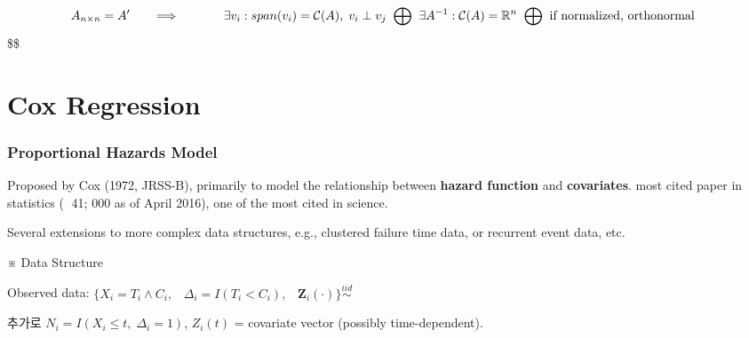 \documentclass[
]{book}
\begin{document}
{{{\begin{alignat}{3}
&A_{n \times n} = A'
&&\; \; \; \Longrightarrow \; \; \; 
&& 
&&
&&


\exists v_i : span(v_i) = \mathcal C (A), \; v_i \perp v_j 
\; \; \tiny {\bigoplus} \; \; \normalsize \exists A^{-1} : \mathcal C(A) = \mathbb{R}^n
\; \; \tiny {\bigoplus} \; \; \normalsize \text{if normalized, orthonormal}

\end{alignat}
\$\$

\hypertarget{section-10}{%
\section{}\label{section-10}}

\hypertarget{section-11}{%
\section{}\label{section-11}}

\hypertarget{section-12}{%
\section{}\label{section-12}}

\hypertarget{cox-regression}{%
\section{Cox Regression}\label{cox-regression}}

\hypertarget{proportional-hazards-model}{%
\subsubsection{Proportional Hazards Model}\label{proportional-hazards-model}}

Proposed by Cox (1972, JRSS-B), primarily to model the relationship between \textbf{hazard function} and \textbf{covariates}. most cited paper in statistics ( 41; 000 as of April 2016), one of the most cited in science.

Several extensions to more complex data structures, e.g., clustered failure time data, or recurrent event data, etc.

※ Data Structure

Observed data: \(\Big \{ X_i = T_i \wedge C_i, \; \; \; \Delta_i = I(T_i < C_i), \; \;\; \mathbf Z_i (\cdot) \Big \} \overset {iid} \sim\)

추가로 \(N_i = I(X_i \le t , \; \Delta_i = 1)\), \(Z_i(t)\) = covariate vector (possibly time-dependent).

}}}
\end{document}
